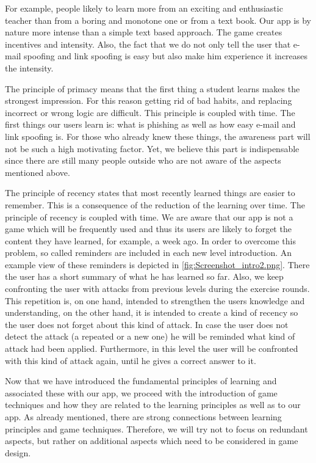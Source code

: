 \begin{description}[leftmargin=0cm]
For example, people likely to learn more from an exciting and enthusiastic teacher than from a boring and monotone one or from a text book.
Our app is by nature more intense than a simple text based approach.
The game creates incentives and intensity.
Also, the fact that we do not only tell the user that e-mail spoofing and link spoofing is easy but also make him experience it increases the intensity.
	\item[Primacy:] The principle of primacy means that the first thing a student learns makes the strongest impression. 
For this reason getting rid of bad habits, and replacing incorrect or wrong logic are difficult. 
This principle is coupled with time. 
The first things our users learn is: what is phishing as well as how easy e-mail and link spoofing is. 
For those who already knew these things, the awareness part will not be such a high motivating factor. 
Yet, we believe this part is indispensable since there are still many people outside who are not aware of the aspects mentioned above. 
	\item[Recency:] The principle of recency states that most recently learned things are easier to remember. 
This is a consequence of the reduction of the learning over time. 
The principle of recency is coupled with time. 
We are aware that our app is not a game which will be frequently used and thus its users are likely to forget the content they have learned, for example, a week ago. 
In order to overcome this problem, so called reminders are included in each new level introduction.
An example view of these reminders is depicted in \autoref{fig:Screenshot_intro2.png}. 
There the user has a short summary of what he has learned so far. 
Also, we keep confronting the user with attacks from previous levels during the exercise rounds.
This repetition is, on one hand, intended to strengthen the users knowledge and understanding, on the other hand, it is intended to create a kind of recency so the user does not forget about this kind of attack. 
In case the user does not detect the attack (a repeated or a new one) he will be reminded what kind of attack had been applied. 
Furthermore, in this level the user will be confronted with this kind of attack again, until he gives a correct answer to it.
\end{description}
Now that we have introduced the fundamental principles of learning and associated these with our app, we proceed with the introduction of game techniques and how they are related to the learning principles as well as to our app. 
As already mentioned, there are strong connections between learning principles and game techniques. 
Therefore, we will try not to focus on redundant aspects, but rather on additional aspects which need to be considered in game design. 
